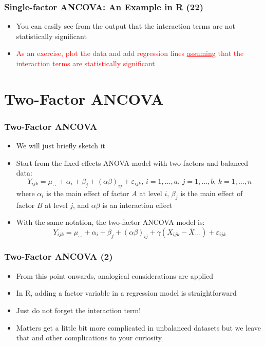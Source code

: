 \documentclass[10pt]{beamer}
\theoremstyle{definition}
\begin{document}
\begin{frame}[fragile]
\frametitle{Single-factor ANCOVA: An Example in R (22)}
\begin{itemize}
	\item You can easily see from the output that the interaction terms are not statistically significant
	\item \textcolor{red}{As an exercise, plot the data and add regression lines \underline{assuming} that the interaction terms are statistically significant}
\end{itemize}
\end{frame}

\section{Two-Factor ANCOVA}
\begin{frame}[fragile]
\frametitle{Two-Factor ANCOVA}
\begin{itemize}
	\item We will just briefly sketch it
	\item Start from the fixed-effects ANOVA model with two factors and balanced data:
	\[
		Y_{ijk} = \mu_{\cdot\cdot} + \alpha_{i} + \beta_{j} + (\alpha\beta)_{ij} + \varepsilon_{ijk},\, i = 1,\ldots,a,\,j = 1,\ldots,b,\, k = 1,\ldots,n
	\]
	where $\alpha_{i}$ is the main effect of factor $A$ at level $i$, $\beta_{j}$ is the main effect of factor $B$ at level $j$, and $\alpha\beta$ is an interaction effect
	\item With the same notation, the two-factor ANCOVA model is:
	\[
		Y_{ijk} = \mu_{\cdot\cdot} + \alpha_{i} + \beta_{j} + (\alpha\beta)_{ij} + \gamma(X_{ijk} - \overline{X}_{\cdot\cdot\cdot})  + \varepsilon_{ijk}
	\]
\end{itemize}
\end{frame}

\begin{frame}[fragile]
\frametitle{Two-Factor ANCOVA (2)}
\begin{itemize}
	\item From this point onwards, analogical considerations are applied
	\item In R, adding a factor variable in a regression model is straightforward
	\item Just do not forget the interaction  term!
	\item Matters get a little bit more complicated in unbalanced datasets but we leave that and other complications to your curiosity
\end{itemize}
\end{frame}
\end{document}
